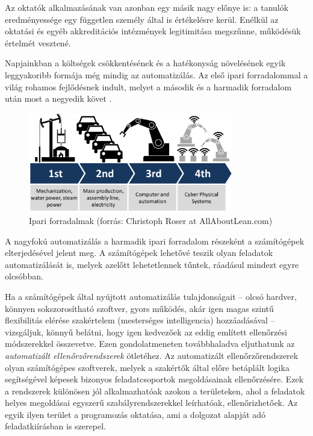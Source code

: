 Az oktatók alkalmazásának van azonban egy másik nagy előnye is: a tanulók eredményessége egy független személy által is értékelésre kerül.
Enélkül az oktatási és egyéb akkreditációs intézmények legitimitása megszűnne, működésük értelmét vesztené.

Napjainkban a költségek csökkentésének és a hatékonyság növelésének egyik leggyakoribb formája még mindig az automatizálás.
Az első ipari forradalommal a világ rohamos fejlődésnek indult, melyet a második és a harmadik forradalom után most a negyedik követ \cite{FourthRevolution}.
\begin{figure}[h]
    \centering
    \includegraphics[width=0.8\textwidth]{figures/industrial_revolutions}
    \caption[Ipari forradalmak]{Ipari forradalmak (forrás: Christoph Roser at AllAboutLean.com)} %
\end{figure} 
A nagyfokú automatizálás a harmadik ipari forradalom részeként a számítógépek elterjedésével jelent meg.
A számítógépek lehetővé teszik olyan feladatok automatizálását is, melyek azelőtt lehetetlennek tűntek, ráadásul mindezt egyre olcsóbban.

Ha a számítógépek által nyújtott automatizálás tulajdonságait -- olcsó hardver, könnyen sokszorosítható szoftver, gyors működés, akár igen magas szintű flexibilitás elérése szakértelem (mesterséges intelligencia) hozzáadásával -- vizsgáljuk, könnyű belátni, hogy igen kedvezőek az eddig említett ellenőrzési módszerekkel összevetve.
Ezen gondolatmeneten továbbhaladva eljuthatunk az \textit{automatizált ellenőrzőrendszerek} ötletéhez.
Az automatizált ellenőrzőrendszerek olyan számítógépes szoftverek, melyek a szakértők által előre betáplált logika segítségével képesek bizonyos feladatcsoportok megoldásainak ellenőrzésére.
Ezek a rendszerek különösen jól alkalmazhatóak azokon a területeken, ahol a feladatok helyes megoldásai egyszerű szabályrendszerekkel leírhatóak, ellenőrizhetőek.
Az egyik ilyen terület a programozás oktatása, ami a dolgozat alapját adó feladatkiírásban is szerepel.

